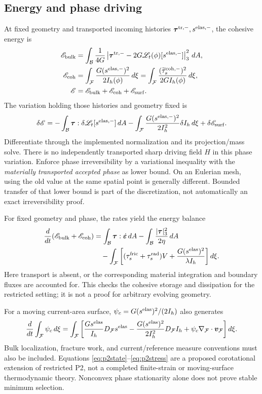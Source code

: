 \documentclass[10pt,letterpaper]{article}
\newcommand{\B}{\mathcal B}
\newcommand{\F}{\mathcal F}
\newcommand{\LL}{\mathscr L}
\newcommand{\ta}{\bm\tau}
\newcommand{\erate}{\dot{\bm\varepsilon}}
\newcommand{\sel}{s^{\rm elas}}
\newcommand{\ds}{D_{\F}}
\begin{document}
\subsection{Energy and phase driving}
At fixed geometry and transported incoming histories $\bm\tau^{\rm tr,-},s^{\rm elas,-}$, the cohesive energy is
\begin{align}
 \mathscr E_{\rm bulk}
 &=\int_\B\frac{1}{4G}\left|\bm\tau^{\rm tr,-} -2G\LL_t(\phi)[s^{\rm elas,-}]\right|_3^2\,dA,\notag\\
 \mathscr E_{\rm coh}
 &=\int_\F\frac{G(s^{\rm elas,-})^2}{2I_h(\phi)}\,d\xi
   =\int_\F\frac{(\widetilde\tau_s^{\rm coh,-})^2}{2GI_h(\phi)}\,d\xi,\notag\\
 \mathscr E&=\mathscr E_{\rm bulk}+\mathscr E_{\rm coh}+\mathscr E_{\rm surf}.
 \label{eq:energy}
\end{align}
The variation holding those histories and geometry fixed is
\begin{equation}
 \delta\mathscr E=-\int_\B\ta:\delta\LL_t[s^{\rm elas,-}]\,dA
 -\int_\F\frac{G(s^{\rm elas,-})^2}{2I_h^2}\delta I_h\,d\xi
 +\delta\mathscr E_{\rm surf}. \label{eq:phasevar}
\end{equation}
Differentiate through the implemented normalization and its projection/mass solve. There is no independently transported sharp driving field $H$ in this phase variation. Enforce phase irreversibility by a variational inequality with the \emph{materially transported accepted phase} as lower bound. On an Eulerian mesh, using the old value at the same spatial point is generally different. Bounded transfer of that lower bound is part of the discretization, not automatically an exact irreversibility proof.

For fixed geometry and phase, the rates yield the energy balance
\begin{align}
 \frac{d}{dt}(\mathscr E_{\rm bulk}+\mathscr E_{\rm coh})
 &=\int_\B\ta:\erate\,dA
 -\int_\B\frac{|\ta|_3^2}{2\eta}\,dA\notag\\
 &\quad-\int_\F\left[(\tau_s^{\rm fric}+\tau_s^{\rm rad})V
             +\frac{G(\sel)^2}{\lambda I_h}\right]d\xi. \label{eq:fixedenergy}
\end{align}
Here transport is absent, or the corresponding material integration and boundary fluxes are accounted for. This checks the cohesive storage and dissipation for the restricted setting; it is not a proof for arbitrary evolving geometry.

For a moving current-area surface, $\psi_c=G(\sel)^2/(2I_h)$ also generates
\begin{equation}
 \frac{d}{dt}\int_\F\psi_c\,d\xi
 =\int_\F\left[\frac{G\sel}{I_h}\ds\sel
 -\frac{G(\sel)^2}{2I_h^2}\ds I_h
 +\psi_c\nabla_\F\cdot\bm v_\F\right]d\xi. \label{eq:movingenergy}
\end{equation}
Bulk localization, fracture work, and current/reference measure conventions must also be included. Equations \eqref{eq:p2state}--\eqref{eq:p2stress} are a proposed corotational extension of restricted P2, not a completed finite-strain or moving-surface thermodynamic theory. Nonconvex phase stationarity alone does not prove stable minimum selection.
\end{document}
